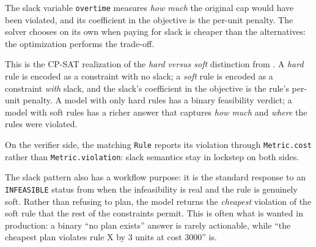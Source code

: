 The slack variable \lstinline!overtime! measures \emph{how
much} the original cap would have been violated, and its coefficient in
the objective is the per-unit penalty. The solver chooses on its own
when paying for slack is cheaper than the alternatives: the
optimization performs the trade-off.

This is the CP-SAT realization of the \emph{hard versus soft}
distinction from . A \emph{hard} rule is encoded as a constraint
with no slack; a \emph{soft} rule is encoded as a constraint \emph{with}
slack, and the slack's coefficient in the objective is the rule's
per-unit penalty. A model with only hard rules has a binary feasibility
verdict; a model with soft rules has a richer answer that captures
\emph{how much} and \emph{where} the rules were violated.

On the verifier side, the matching \lstinline!Rule!
reports its violation through \lstinline!Metric.cost!
rather than \lstinline!Metric.violation!: slack
semantics stay in lockstep on both sides.

The slack pattern also has a workflow purpose: it is the standard
response to an \lstinline!INFEASIBLE! status from 
when the infeasibility is real and the rule is genuinely soft. Rather
than refusing to plan, the model returns the \emph{cheapest} violation
of the soft rule that the rest of the constraints permit. This is often
what is wanted in production: a binary ``no plan exists'' answer is
rarely actionable, while ``the cheapest plan violates rule X by 3 units
at cost 3000'' is.
